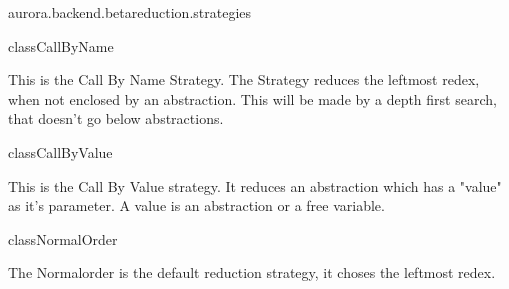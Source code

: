 \begin{texdocpackage}{aurora.backend.betareduction.strategies}
\label{texdoclet:aurora.backend.betareduction.strategies}

\begin{texdocclass}{class}{CallByName}
\label{texdoclet:aurora.backend.betareduction.strategies.CallByName}
\begin{texdocclassintro}
This is the Call By Name Strategy. The Strategy reduces the leftmost redex, when not enclosed by an abstraction.
 This will be made by a depth first search, that doesn't go below abstractions.\end{texdocclassintro}
\begin{texdocclassconstructors}
\end{texdocclassconstructors}
\begin{texdocclassmethods}
\end{texdocclassmethods}
\end{texdocclass}


\begin{texdocclass}{class}{CallByValue}
\label{texdoclet:aurora.backend.betareduction.strategies.CallByValue}
\begin{texdocclassintro}
This is the Call By Value strategy. It reduces an abstraction which has a "value" as it's parameter. A value is an abstraction or a free variable.\end{texdocclassintro}
\begin{texdocclassconstructors}
\end{texdocclassconstructors}
\begin{texdocclassmethods}
\end{texdocclassmethods}
\end{texdocclass}


\begin{texdocclass}{class}{NormalOrder}
\label{texdoclet:aurora.backend.betareduction.strategies.NormalOrder}
\begin{texdocclassintro}
The Normalorder is the default reduction strategy, it choses the leftmost redex.\end{texdocclassintro}
\begin{texdocclassconstructors}
\end{texdocclassconstructors}
\begin{texdocclassmethods}
\end{texdocclassmethods}
\end{texdocclass}



\end{texdocpackage}
